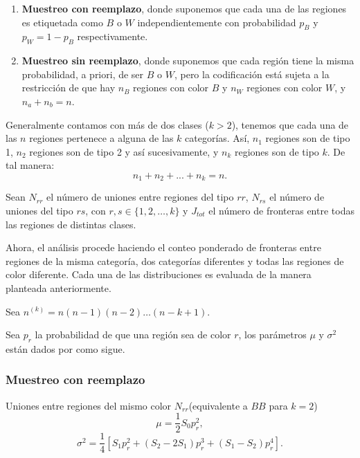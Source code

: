 \begin{enumerate}
\item \textbf{Muestreo con reemplazo}, donde suponemos que cada una de las regiones es etiquetada como $B$ o $W$ independientemente con probabilidad $p_B$ y $p_W=1-p_B$ respectivamente. 

\item \textbf{Muestreo sin reemplazo}, donde suponemos que cada región tiene la misma probabilidad, a priori, de ser $B$ o $W$, pero la codificación está sujeta a la restricción de que hay $n_B$ regiones con color $B$ y $n_W$ regiones con color $W$, y $n_a+n_b=n$.
\end{enumerate}

Generalmente contamos con más de dos clases ($k > 2$), tenemos que cada una de las $n$ regiones pertenece a alguna de las $k$ categorías. Así, $n_{1}$ regiones son de tipo 1, $n_{2}$ regiones son de tipo 2 y así sucesivamente, y $n_{k}$ regiones son de tipo $k$. De tal manera:
\begin{equation}
n_{1}+n_{2}+...+n_{k}=n.
\end{equation}

Sean $N_{rr}$ el número de uniones entre regiones del tipo $rr$,  $N_{rs}$ el número de uniones del tipo $rs$, con  $r,s \in \{1,2, \dots, k\}$ y $J_{tot}$ el número de fronteras entre todas las regiones de distintas clases. 


Ahora, el análisis procede haciendo el conteo ponderado de fronteras entre regiones de la misma categoría, dos categorías diferentes y todas las regiones de color diferente. Cada una de las distribuciones es evaluada de la manera planteada anteriormente.

Sea $n^{(k)}=n(n-1)(n-2)\dots(n-k+1)$.

Sea $p_r$ la probabilidad de que una región sea de color $r$, los parámetros $\mu$ y $\sigma^2$ están dados por \citet{moran48} como sigue.


\subsubsection*{Muestreo con reemplazo}
Uniones entre regiones del mismo color $N_{rr}$(equivalente a $BB$ para $k=2$)
\begin{equation}
\mu = \dfrac{1}{2} S_0 p_r^2,
\end{equation}
\begin{equation}
\sigma^2 = \dfrac{1}{4} \left[ S_1 p_r^2 + (S_2-2S_1)p_r^3 + (S_1-S_2)p_r^4 \right] .
\end{equation}


